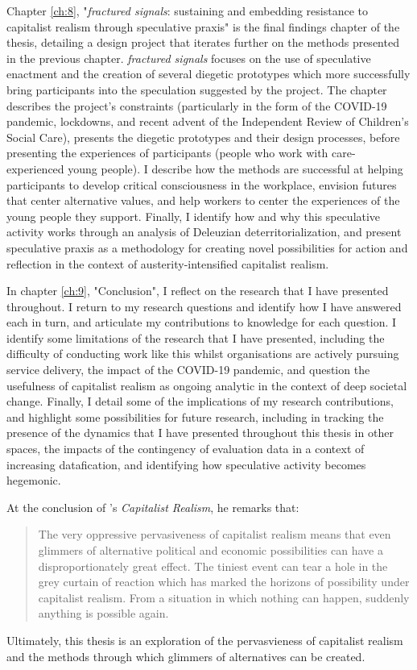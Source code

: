 Chapter \ref{ch:8}, "\textit{fractured signals}: sustaining and embedding resistance to capitalist realism through speculative praxis" is the final findings chapter of the thesis, detailing a design project that iterates further on the methods presented in the previous chapter. \textit{fractured signals} focuses on the use of speculative enactment and the creation of several diegetic prototypes which more successfully bring participants into the speculation suggested by the project. The chapter describes the project's constraints (particularly in the form of the COVID-19 pandemic, lockdowns, and recent advent of the Independent Review of Children's Social Care), presents the diegetic prototypes and their design processes, before presenting the experiences of participants (people who work with care-experienced young people). I describe how the methods are successful at helping participants to develop critical consciousness in the workplace, envision futures that center alternative values, and help workers to center the experiences of the young people they support. Finally, I identify how and why this speculative activity works through an analysis of Deleuzian deterritorialization, and present speculative praxis as a methodology for creating novel possibilities for action and reflection in the context of austerity-intensified capitalist realism.

In chapter \ref{ch:9}, "Conclusion", I reflect on the research that I have presented throughout. I return to my research questions and identify how I have answered each in turn, and articulate my contributions to knowledge for each question. I identify some limitations of the research that I have presented, including the difficulty of conducting work like this whilst organisations are actively pursuing service delivery, the impact of the COVID-19 pandemic, and question the usefulness of capitalist realism as ongoing analytic in the context of deep societal change. Finally, I detail some of the implications of my research contributions, and highlight some possibilities for future research, including in tracking the presence of the dynamics that I have presented throughout this thesis in other spaces, the impacts of the contingency of evaluation data in a context of increasing datafication, and identifying how speculative activity becomes hegemonic. 

At the conclusion of \citet{fisher_capitalist_2009}'s \textit{Capitalist Realism}, he remarks that:
\begin{quote}
The very oppressive pervasiveness of capitalist realism means that even glimmers of alternative political and economic possibilities can have a disproportionately great effect. The tiniest event can tear a hole in the grey curtain of reaction which has marked the horizons of possibility under capitalist realism. From a situation in which nothing can happen, suddenly anything is possible again.
\end{quote}
Ultimately, this thesis is an exploration of the pervasvieness of capitalist realism and the methods through which glimmers of alternatives can be created. 


